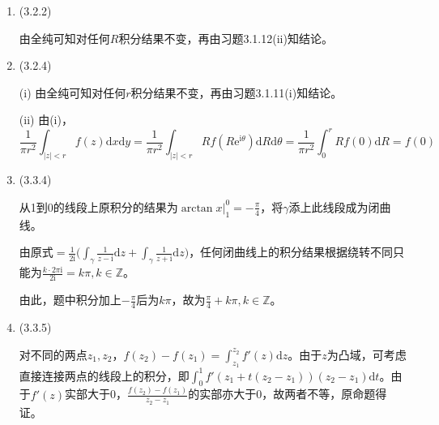 \documentclass[a4paper,UTF8,fontset=windows]{ctexart}
\begin{document}
\begin{enumerate}
    (iv) 原式$=\int_{|z-a\mathrm{i}|=\varepsilon}\frac{\mathrm{e}^z}{(z-a\mathrm{i})(z+a\mathrm{i})}\mathrm{d}z+\int_{|z+a\mathrm{i}|=\varepsilon}\frac{\mathrm{e}^z}{(z-a\mathrm{i})(z+a\mathrm{i})}\mathrm{d}z$
    
    令$\varepsilon$足够小并趋于0，左侧为$\frac{\mathrm{e}^{a\mathrm{i}}}{a\mathrm{i}+a\mathrm{i}}\int_{|z-a\mathrm{i}|=\varepsilon}\frac{1}{z-a\mathrm{i}}\mathrm{d}z=\frac{\pi\mathrm{e}^{a\mathrm{i}}}{a}$，同理右侧为$\frac{\pi\mathrm{e}^{-a\mathrm{i}}}{-a}$，从而和为$\frac{2\pi\mathrm{i}}{a}\sin a$。
    
    \item (3.2.2)
    
    由全纯可知对任何$R$积分结果不变，再由习题3.1.12(ii)知结论。
    
    \item (3.2.4)
    
    (i) 由全纯可知对任何$r$积分结果不变，再由习题3.1.11(i)知结论。
    
    (ii) 由(i)，
    \[\frac{1}{\pi r^2}\int_{|z|<r}f(z)\mathrm{d}x\mathrm{d}y=\frac{1}{\pi r^2}\int_{|z|<r}Rf(R\mathrm{e}^{\mathrm{i}\theta})\mathrm{d}R\mathrm{d}\theta=\frac{1}{\pi r^2}\int_0^rRf(0)\mathrm{d}R=f(0)\]
    
    \item (3.3.4)
    
    从1到0的线段上原积分的结果为$\arctan x\big|^0_1=-\frac{\pi}{4}$，将$\gamma$添上此线段成为闭曲线。
    
    由原式$=\frac{1}{2\mathrm{i}}\big(\int_\gamma\frac{1}{z-\mathrm{i}}\mathrm{d}z+\int_\gamma\frac{1}{z+\mathrm{i}}\mathrm{d}z\big)$，任何闭曲线上的积分结果根据绕转不同只能为$\frac{k\cdot2\pi\mathrm{i}}{2\mathrm{i}}=k\pi,k\in\mathbb{Z}$。
    
    由此，题中积分加上$-\frac{\pi}{4}$后为$k\pi$，故为$\frac{\pi}{4}+k\pi,k\in\mathbb{Z}$。
    
    \item (3.3.5)
    
    对不同的两点$z_1,z_2$，$f(z_2)-f(z_1)=\int_{z_1}^{z_2}f'(z)\mathrm{d}z$。由于$z$为凸域，可考虑直接连接两点的线段上的积分，即$\int_0^1f'(z_1+t(z_2-z_1))(z_2-z_1)\mathrm{d}t$。由于$f'(z)$实部大于0，$\frac{f(z_2)-f(z_1)}{z_2-z_1}$的实部亦大于0，故两者不等，原命题得证。
\end{enumerate}
\end{document}
